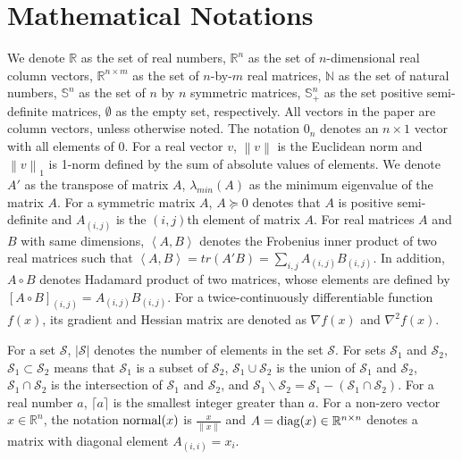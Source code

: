 \documentclass[journal]{IEEEtran}
\begin{document}
\section{Mathematical Notations} \label{preliminaries_sec}

\par We denote $\mathbb{R}$ as the set of real numbers, $\mathbb{R}^n$ as the set of $n$-dimensional real column vectors, $\mathbb{R}^{n\times m}$ as the set of $n$-by-$m$ real matrices, $\mathbb{N}$ as the set of natural numbers, $\mathbb{S}^n$ as the set of $n$ by $n$ symmetric matrices, $\mathbb{S}_+^n$ as the set positive semi-definite matrices, $\emptyset$  as the empty set, respectively. All vectors in the paper are column vectors, unless otherwise noted. The notation $0_n$ denotes an $n \times 1$ vector with all elements of $0$. For a real vector $v$, $\left\|v\right\|$ is the Euclidean norm and $\left\|v\right\|_1$ is 1-norm defined by the sum of  absolute values of elements. We denote $A'$ as the transpose of matrix $A$, $\lambda_{min}(A)$ as the minimum eigenvalue of the matrix $A$. For a symmetric matrix $A$, $A \succeq 0$ denotes that $A$ is positive semi-definite and $A_{(i,j)}$ is the $(i,j)$th element of matrix $A$. For real matrices $A$ and $B$ with same dimensions, $\left<A, B\right>$ denotes the Frobenius inner product of two real matrices such that $\left< A,B\right>=tr(A'B)=\sum_{i,j}A_{(i,j)}B_{(i,j)}$. In addition, $A\circ B$ denotes Hadamard product of two matrices, whose elements are defined by $[A\circ B]_{(i,j)}=A_{(i,j)}B_{(i,j)}$. For a twice-continuously differentiable function $f(x)$, its gradient and Hessian matrix are denoted as $\nabla f(x)$ and $\nabla^2 f(x)$.
\par For a set $\mathcal{S}$, $\left|\mathcal{S}\right|$ denotes the number of elements in the set $\mathcal{S}$. For sets $\mathcal{S}_1$ and $\mathcal{S}_2$, $\mathcal{S}_1\subset \mathcal{S}_2$ means that $\mathcal{S}_1$ is a subset of $\mathcal{S}_2$, $\mathcal{S}_1\cup \mathcal{S}_2$ is the union of $\mathcal{S}_1$ and $\mathcal{S}_2$, $\mathcal{S}_1 \cap \mathcal{S}_2$ is the intersection of $\mathcal{S}_1$ and $\mathcal{S}_2$, and $\mathcal{S}_1\backslash \mathcal{S}_2=\mathcal{S}_1-(\mathcal{S}_1\cap \mathcal{S}_2)$. For a real number $a$, $\lceil a \rceil$ is the smallest integer greater than $a$. For a non-zero vector $x\in \mathbb{R}^n$, the notation ${\rm normal}(x)$ is $\frac{x}{\left\|x\right\|}$ and $A={\rm diag}(x)\in \mathbb{R}^{n\times n}$ denotes a matrix with diagonal element $A_{(i,i)}=x_i$.
\end{document}

